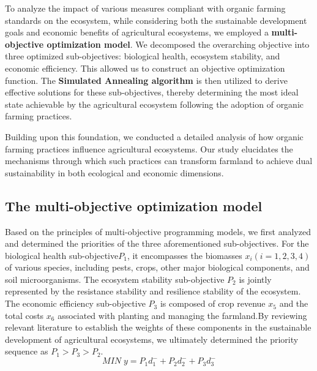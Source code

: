 \documentclass[12pt]{article}
\begin{document}
	To analyze the impact of various measures compliant with organic farming standards on the ecosystem, while considering both the sustainable development goals and economic benefits of agricultural ecosystems, we employed a \textbf{multi-objective optimization model}. We decomposed the overarching objective into three optimized sub-objectives: biological health, ecosystem stability, and economic efficiency. This allowed us to construct an objective optimization function. The \textbf{Simulated Annealing algorithm} is then utilized to derive effective solutions for these sub-objectives, thereby determining the most ideal state achievable by the agricultural ecosystem following the adoption of organic farming practices.
	
	Building upon this foundation, we conducted a detailed analysis of how organic farming practices influence agricultural ecosystems. Our study elucidates the mechanisms through which such practices can transform farmland to achieve dual sustainability in both ecological and economic dimensions.
	
	\subsection{The multi-objective optimization model}
	\hspace{2em}Based on the principles of multi-objective programming models, we first analyzed and determined the priorities of the three aforementioned sub-objectives. For the biological health sub-objective$P_1$, it encompasses the biomasses $x_i(i = 1,2,3,4)$ of various species, including pests, crops, other major biological components, and soil microorganisms. The ecosystem stability sub-objective $P_2$ is jointly represented by the resistance stability and resilience stability of the ecosystem. The economic efficiency sub-objective $P_3$ is composed of crop revenue $x_5$ and the total costs $x_6$ associated with planting and managing the farmland.By reviewing relevant literature to establish the weights of these components in the sustainable development of agricultural ecosystems, we ultimately determined the priority sequence as $P_1 > P_3 > P_2$.
	\begin{equation}
		MIN\;y=P_1d_1^-+P_2d_2^-+P_3d_3^-
	\end{equation}
	
\end{document}
